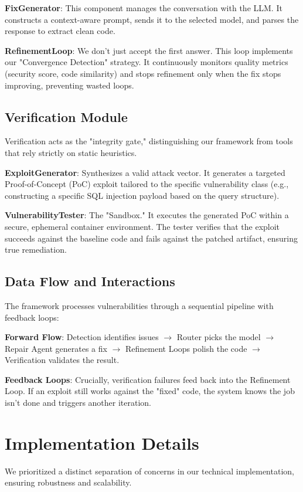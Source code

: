 \documentclass[conference]{IEEEtran}
\begin{document}
\textbf{FixGenerator}: This component manages the conversation with the LLM. It constructs a context-aware prompt, sends it to the selected model, and parses the response to extract clean code.

\textbf{RefinementLoop}: We don't just accept the first answer. This loop implements our "Convergence Detection" strategy. It continuously monitors quality metrics (security score, code similarity) and stops refinement only when the fix stops improving, preventing wasted loops.

\subsection{Verification Module}
Verification acts as the "integrity gate," distinguishing our framework from tools that rely strictly on static heuristics.

\textbf{ExploitGenerator}: Synthesizes a valid attack vector. It generates a targeted Proof-of-Concept (PoC) exploit tailored to the specific vulnerability class (e.g., constructing a specific SQL injection payload based on the query structure).

\textbf{VulnerabilityTester}: The "Sandbox." It executes the generated PoC within a secure, ephemeral container environment. The tester verifies that the exploit succeeds against the baseline code and fails against the patched artifact, ensuring true remediation.

\subsection{Data Flow and Interactions}
The framework processes vulnerabilities through a sequential pipeline with feedback loops:

\textbf{Forward Flow}: Detection identifies issues $\rightarrow$ Router picks the model $\rightarrow$ Repair Agent generates a fix $\rightarrow$ Refinement Loops polish the code $\rightarrow$ Verification validates the result.

\textbf{Feedback Loops}: Crucially, verification failures feed back into the Refinement Loop. If an exploit still works against the "fixed" code, the system knows the job isn't done and triggers another iteration.

\section{Implementation Details}

We prioritized a distinct separation of concerns in our technical implementation, ensuring robustness and scalability.
\end{document}

